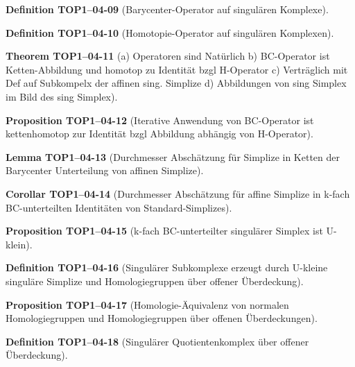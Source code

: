 \documentclass[10pt, letterpaper]{article}
\newcommand{\CustomHeading}[3]{%
  \par\medskip\noindent%
  \textbf{#1 #2} \textnormal{(#3)}.\enskip%
}
\newenvironment{DEF}[2]{\CustomHeading{Definition}{#1}{#2}}{}
\newenvironment{PROP}[2]{\CustomHeading{Proposition}{#1}{#2}}{}
\newenvironment{THEO}[2]{\CustomHeading{Theorem}{#1}{#2}}{}
\newenvironment{LEM}[2]{\CustomHeading{Lemma}{#1}{#2}}{}
\newenvironment{KORO}[2]{\CustomHeading{Corollar}{#1}{#2}}{}
\begin{document}
\begin{DEF}{TOP1--04-09}{Barycenter-Operator auf singulären Komplexe}
\end{DEF}

\begin{DEF}{TOP1--04-10}{Homotopie-Operator auf singulären Komplexen}
\end{DEF}

\begin{THEO}{TOP1--04-11}{a) Operatoren sind Natürlich 
b) BC-Operator ist Ketten-Abbildung und homotop zu Identität bzgl H-Operator 
c) Verträglich mit Def auf Subkompelx der affinen sing. Simplize
d) Abbildungen von sing Simplex im Bild des sing Simplex}
\end{THEO}

\begin{PROP}{TOP1--04-12}{Iterative Anwendung von BC-Operator ist kettenhomotop zur Identität bzgl Abbildung abhängig von H-Operator}
\end{PROP}

\begin{LEM}{TOP1--04-13}{Durchmesser Abschätzung für Simplize in Ketten der Barycenter Unterteilung von affinen Simplize}
\end{LEM}

\begin{KORO}{TOP1--04-14}{Durchmesser Abschätzung für affine Simplize in k-fach BC-unterteilten Identitäten von Standard-Simplizes}
\end{KORO}

\begin{PROP}{TOP1--04-15}{k-fach BC-unterteilter singulärer Simplex ist U-klein}
\end{PROP}

\begin{DEF}{TOP1--04-16}{Singulärer Subkomplexe erzeugt durch U-kleine singuläre Simplize und Homologiegruppen über offener Überdeckung}
\end{DEF}

\begin{PROP}{TOP1--04-17}{Homologie-Äquivalenz von normalen Homologiegruppen und Homologiegruppen über offenen Überdeckungen}
\end{PROP}

\begin{DEF}{TOP1--04-18}{Singulärer Quotientenkomplex über offener Überdeckung}
\end{DEF}
\end{document}
